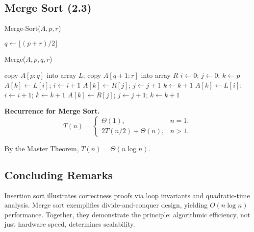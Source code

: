 \documentclass[12pt]{article}
\theoremstyle{definition}
\begin{document}
\subsection*{Merge Sort (2.3)}

\begin{algorithm}[H]
\caption{Merge-Sort($A, p, r$)}
\begin{algorithmic}[1]
  \State \Return
\EndIf
\State $q \gets \lfloor (p+r)/2 \rfloor$
\State {}
\State {}
\State {}
\end{algorithmic}
\end{algorithm}

\begin{algorithm}[H]
\caption{Merge($A, p, q, r$)}
\begin{algorithmic}[1]
\State copy $A[p:q]$ into array $L$; copy $A[q+1:r]$ into array $R$
\State $i \gets 0$;\; $j \gets 0$;\; $k \gets p$
    \State $A[k] \gets L[i]$;\; $i \gets i+1$
  \Else
    \State $A[k] \gets R[j]$;\; $j \gets j+1$
  \EndIf
  \State $k \gets k+1$
\EndWhile
{}
  \State $A[k] \gets L[i]$;\; $i \gets i+1$;\; $k \gets k+1$
\EndWhile
{}
  \State $A[k] \gets R[j]$;\; $j \gets j+1$;\; $k \gets k+1$
\EndWhile
\end{algorithmic}
\end{algorithm}

\textbf{Recurrence for Merge Sort.}  
\[
T(n) = 
\begin{cases}
\Theta(1), & n=1, \\
2T(n/2) + \Theta(n), & n > 1.
\end{cases}
\]

By the Master Theorem, $T(n) = \Theta(n \log n)$.

\subsection*{Concluding Remarks}
Insertion sort illustrates correctness proofs via loop invariants and 
quadratic-time analysis. Merge sort exemplifies divide-and-conquer design, 
yielding $O(n \log n)$ performance. Together, they demonstrate the principle: 
algorithmic efficiency, not just hardware speed, determines scalability.
\end{document}
